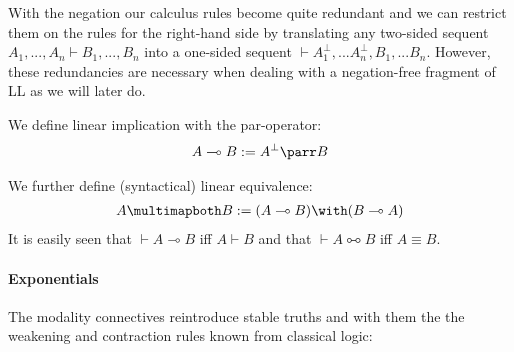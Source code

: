 \documentclass[DIN, pagenumber=false, fontsize=11pt, parskip=half, colorinlistoftodos, svgnames]{scrartcl}
\begin{document}
	With the negation our calculus rules become quite redundant and we can restrict them on the rules for the right-hand side by translating any two-sided sequent 
	$A_1, ..., A_n \vdash B_1, ..., B_n$ 
	into a one-sided sequent 
	$\vdash A_1^\bot, ... A_n^\bot, B_1, ... B_n$. 
	However, these redundancies are necessary when dealing with a negation-free fragment of LL as we will later do.
	
	
	\begin{definition}
		We define linear implication with the par-operator:
		\begin{align*}
			A \multimap B := A^\bot \parr B
		\end{align*}
		
		We further define (syntactical) linear equivalence:
		\begin{align*}
			A \multimapboth B := (A \multimap B) \with (B \multimap A)
		\end{align*}
		It is easily seen that $\vdash A\multimap B$ iff $A \vdash B$ and that $\vdash A \multimapboth B$ iff $A \equiv B$. 
	\end{definition}
	
	\paragraph{Exponentials }
	The modality connectives reintroduce stable truths and with them the the weakening and contraction rules known from classical logic:
	
\end{document}
